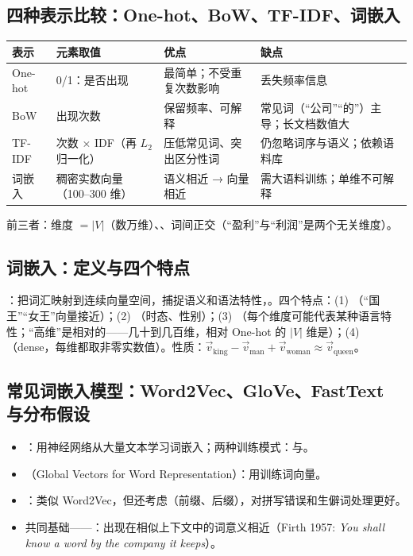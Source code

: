 \subsection{四种表示比较：One-hot、BoW、TF-IDF、词嵌入}
\begin{center}\small
\begin{tabularx}{\linewidth}{@{}p{1.5cm}p{3.3cm}LL@{}}
\toprule
表示 & 元素取值 & 优点 & 缺点 \\
\midrule
One-hot & 0/1：是否出现 & 最简单；不受重复次数影响 & 丢失频率信息 \\
BoW & 出现次数 & 保留频率、可解释 & 常见词（“公司”“的”）主导；长文档数值大 \\
TF-IDF & 次数 × IDF（再 $L_2$ 归一化）& 压低常见词、突出区分性词 & 仍忽略词序与语义；依赖语料库 \\
词嵌入 & 稠密实数向量（100–300 维）& 语义相近 → 向量相近 & 需大语料训练；单维不可解释 \\
\bottomrule
\end{tabularx}
\end{center}
前三者：维度 $=|V|$（数万维）、、词间正交（“盈利”与“利润”是两个无关维度）。

\subsection{词嵌入：定义与四个特点}
：把词汇映射到连续向量空间，捕捉语义和语法特性，。四个特点：(1) （“国王”“女王”向量接近）；(2) （时态、性别）；(3) （每个维度可能代表某种语言特性；“高维”是相对的——几十到几百维，相对 One-hot 的 $|V|$ 维是）；(4) （dense，每维都取非零实数值）。性质：$\vec v_{\text{king}}-\vec v_{\text{man}}+\vec v_{\text{woman}}\approx\vec v_{\text{queen}}$。

\subsection{常见词嵌入模型：Word2Vec、GloVe、FastText 与分布假设}
\begin{itemize}
\item {}：用神经网络从大量文本学习词嵌入；两种训练模式：与。
\item {}（Global Vectors for Word Representation）：用训练词向量。
\item {}：类似 Word2Vec，但还考虑（前缀、后缀），对拼写错误和生僻词处理更好。
\item 共同基础——：出现在相似上下文中的词意义相近（Firth 1957: \textit{You shall know a word by the company it keeps}）。
\end{itemize}

